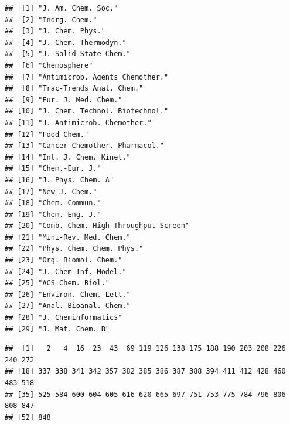 \documentclass[]{book}
\newenvironment{Shaded}{\begin{snugshade}}{\end{snugshade}}
\newcommand{\CommentTok}[1]{\textcolor[rgb]{0.56,0.35,0.01}{\textit{#1}}}
\newcommand{\DecValTok}[1]{\textcolor[rgb]{0.00,0.00,0.81}{#1}}
\newcommand{\KeywordTok}[1]{\textcolor[rgb]{0.13,0.29,0.53}{\textbf{#1}}}
\newcommand{\NormalTok}[1]{#1}
\newcommand{\OperatorTok}[1]{\textcolor[rgb]{0.81,0.36,0.00}{\textbf{#1}}}
\newcommand{\StringTok}[1]{\textcolor[rgb]{0.31,0.60,0.02}{#1}}
\begin{document}
\begin{verbatim}
##  [1] "J. Am. Chem. Soc."                 
##  [2] "Inorg. Chem."                      
##  [3] "J. Chem. Phys."                    
##  [4] "J. Chem. Thermodyn."               
##  [5] "J. Solid State Chem."              
##  [6] "Chemosphere"                       
##  [7] "Antimicrob. Agents Chemother."     
##  [8] "Trac-Trends Anal. Chem."           
##  [9] "Eur. J. Med. Chem."                
## [10] "J. Chem. Technol. Biotechnol."     
## [11] "J. Antimicrob. Chemother."         
## [12] "Food Chem."                        
## [13] "Cancer Chemother. Pharmacol."      
## [14] "Int. J. Chem. Kinet."              
## [15] "Chem.-Eur. J."                     
## [16] "J. Phys. Chem. A"                  
## [17] "New J. Chem."                      
## [18] "Chem. Commun."                     
## [19] "Chem. Eng. J."                     
## [20] "Comb. Chem. High Throughput Screen"
## [21] "Mini-Rev. Med. Chem."              
## [22] "Phys. Chem. Chem. Phys."           
## [23] "Org. Biomol. Chem."                
## [24] "J. Chem Inf. Model."               
## [25] "ACS Chem. Biol."                   
## [26] "Environ. Chem. Lett."              
## [27] "Anal. Bioanal. Chem."              
## [28] "J. Cheminformatics"                
## [29] "J. Mat. Chem. B"
\end{verbatim}

\begin{Shaded}
\end{Shaded}

\begin{verbatim}
##  [1]   2   4  16  23  43  69 119 126 138 175 188 190 203 208 226 240 272
## [18] 337 338 341 342 357 382 385 386 387 388 394 411 412 428 460 483 518
## [35] 525 584 600 604 605 616 620 665 697 751 753 775 784 796 806 808 847
## [52] 848
\end{verbatim}

\begin{Shaded}
\end{Shaded}
\end{document}
